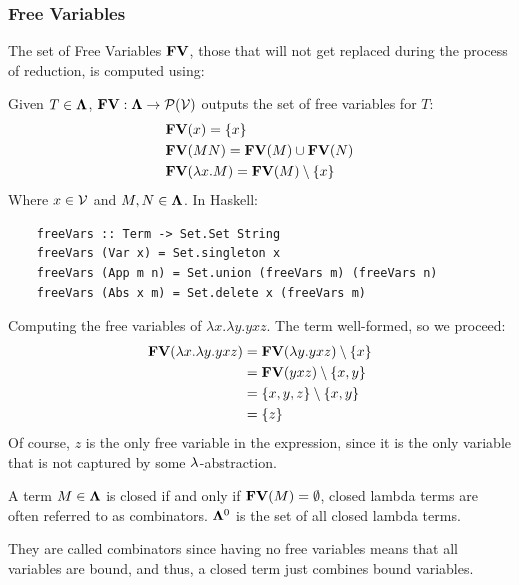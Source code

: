 \subsubsection{\centering Free Variables}
The set of Free Variables $\mathbf{FV}$, those that will not get replaced during the process of reduction, is computed using:
\begin{definition} Given $T \in \mathbf{\Lambda} $, $\mathbf{FV} : \mathbf{\Lambda} \to \mathcal{P}(\mathcal{V}) $ outputs the set of free variables for $T$:
  \begin{align*}
    & \mathbf{FV}(x) = \{x\}\\
    & \mathbf{FV}(MN) = \mathbf{FV}(M) \cup \mathbf{FV}(N) \\
    & \mathbf{FV}(\lambda x . M) = \mathbf{FV}(M) \setminus \{x\}
  \end{align*}
  Where $ x \in \mathcal{V} $ and $ M, N \in \mathbf{\Lambda} $. In Haskell:
  \begin{verbatim}
    freeVars :: Term -> Set.Set String
    freeVars (Var x) = Set.singleton x
    freeVars (App m n) = Set.union (freeVars m) (freeVars n)
    freeVars (Abs x m) = Set.delete x (freeVars m)
  \end{verbatim}  
\end{definition}
\begin{example} Computing the free variables of $\lambda x . \lambda y . y x z$. The term well-formed, so we proceed:
  \begin{align*}
    \mathbf{FV}(\lambda x . \lambda y . y x z) &= \mathbf{FV}(\lambda y . yxz) \setminus \{x\} \\
                                        &= \mathbf{FV}(yxz) \setminus \{x, y\} \\
                                        &= \{x, y, z\} \setminus \{x, y\} \\
                                        &= \{z\}
  \end{align*}
  Of course, $z$ is the only free variable in the expression, since it is the only variable that is not captured by some $\lambda$-abstraction.
\end{example}
\begin{definition}
  A term $M \in \mathbf{\Lambda}$ is closed if and only if $\mathbf{FV}(M) = \emptyset$, closed lambda terms are often referred to as combinators. $\mathbf{\Lambda}^0$ is the set of all closed lambda terms.
\end{definition}
\begin{note} They are called combinators since having no free variables means that all variables are bound, and thus, a closed term just combines bound variables.
\end{note}

